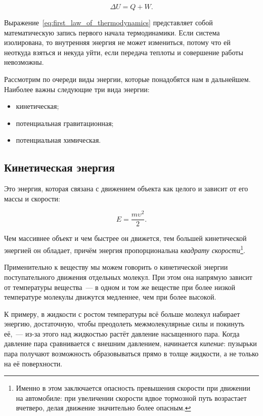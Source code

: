 \begin{equation}
    \label{eq:first_law_of_thermodynamics}
    \boxed{\Delta U = Q + W}.
\end{equation}

Выражение~\eqref{eq:first_law_of_thermodynamics} представляет собой математическую запись первого начала термодинамики. Если система изолирована, то внутренняя энергия не может измениться, потому что ей неоткуда взяться и некуда уйти, если передача теплоты и совершение работы невозможны.

Рассмотрим по очереди виды энергии, которые понадобятся нам в дальнейшем. Наиболее важны следующие три вида энергии:

\begin{itemize}
    \item кинетическая;
    \item потенциальная гравитационная;
    \item потенциальная химическая.
\end{itemize}

\subsection*{Кинетическая энергия}

Это энергия, которая связана с движением объекта как целого и зависит от его массы и скорости:

\begin{equation*}
    E = \frac{m{\upsilon}^2}{2}.
\end{equation*}

Чем массивнее объект и чем быстрее он движется, тем большей кинетической энергией он обладает, причём энергия пропорциональна \emph{квадрату скорости}\footnote{Именно в этом заключается опасность превышения скорости при движении на автомобиле: при увеличении скорости вдвое тормозной путь возрастает вчетверо, делая движение значительно более опасным.}.

Применительно к веществу мы можем говорить о кинетической энергии поступательного движения отдельных молекул. При этом она напрямую зависит от температуры вещества~--- в одном и том же веществе при более низкой температуре молекулы движутся медленнее, чем при более высокой.

К примеру, в жидкости с ростом температуры всё больше молекул набирает энергию, достаточную, чтобы преодолеть межмолекулярные силы и покинуть её,~--- из-за этого над жидкостью растёт давление насыщенного пара. Когда давление пара сравнивается с внешним давлением, начинается \emph{кипение}: пузырьки пара получают возможность образовываться прямо в толще жидкости, а не только на её поверхности.


